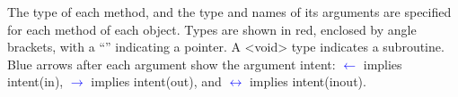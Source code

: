 The type of each method, and the type and names of its arguments are specified for each method of each object. Types are shown in red, enclosed by angle brackets, with a ``{\normalfont \ttfamily *}'' indicating a pointer. A {\normalfont \ttfamily \textless void\textgreater} type indicates a subroutine. Blue arrows after each argument show the argument intent: \textcolor{blue}{$\leftarrow$} implies {\normalfont \ttfamily intent(in)},  \textcolor{blue}{$\rightarrow$} implies {\normalfont \ttfamily intent(out)}, and \textcolor{blue}{$\leftrightarrow$} implies {\normalfont \ttfamily intent(inout)}.



